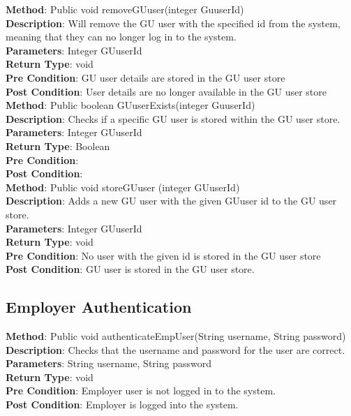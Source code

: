 \documentclass{l3deliverable}
\begin{document}
\textbf{Method}: Public void removeGUuser(integer GuuserId)\\
\textbf{Description}: Will remove the GU user with the specified id from the system, meaning that they can no longer log in to the system.
\\
\textbf{Parameters}: Integer GUuserId\\
\textbf{Return Type}: void\\
\textbf{Pre Condition}: GU user details are stored in the GU user store\\
\textbf{Post Condition}: User details are no longer available in the GU user store\\

\textbf{Method}: Public boolean GUuserExists(integer GuuserId)\\
\textbf{Description}: Checks if a specific GU user is stored within the GU user store.\\
\textbf{Parameters}: Integer GUuserId\\
\textbf{Return Type}: Boolean\\
\textbf{Pre Condition}:\\
\textbf{Post Condition}:\\

\textbf{Method}: Public void storeGUuser (integer GUuserId)\\
\textbf{Description}: Adds a new GU user with the given GUuser id to the GU user store.\\
\textbf{Parameters}: Integer GUuserId\\
\textbf{Return Type}: void\\
\textbf{Pre Condition}: No user with the given id is stored in the GU user store\\
\textbf{Post Condition}: GU user is stored in the GU user store.\\

\subsection{Employer Authentication}

\textbf{Method}: Public void authenticateEmpUser(String username, String password)\\
\textbf{Description}: Checks that the username and password for the user are correct.\\
\textbf{Parameters}: String username, String password\\
\textbf{Return Type}: void\\
\textbf{Pre Condition}: Employer user is not logged in to the system.\\
\textbf{Post Condition}: Employer is logged into the system.\\
\end{document}
